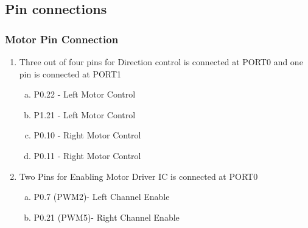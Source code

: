 \documentclass[table,10pt,red]{beamer}
\begin{document}
\subsection{Pin connections}
	\begin{frame}
		\frametitle{Motor Pin Connection}	\pause
			\begin{enumerate}
				\item <+-|alert@+> Three out of four pins for Direction control is connected at PORT0 and one pin is connected at PORT1\pause \\[10pt]
				\begin{enumerate}[a.]
					\item <1-> P0.22 - Left Motor Control\\[10pt]
					\item <1-> P1.21 - Left Motor Control\\[10pt]
					\item <2-> P0.10 - Right Motor Control\\[10pt]
					\item <2-> P0.11 - Right Motor Control\\[10pt]
				\end{enumerate} \pause
			\item <+-|alert@+> Two Pins for Enabling Motor Driver IC is connected at PORT0 \pause\\[10pt]
			\begin{enumerate}[a.]
					\item <1-> P0.7 (PWM2)- Left Channel Enable\\[10pt]
					\item <2-> P0.21 (PWM5)- Right Channel Enable\\[10pt]
			\end{enumerate}
			\end{enumerate}	
	\end{frame}
\end{document}
